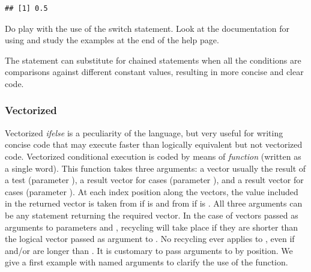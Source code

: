\documentclass[krantz2]{krantz}\usepackage{knitr}
\begin{document}
\begin{knitrout}\footnotesize
{}\color{fgcolor}\begin{kframe}
\begin{alltt}
 \hlkwb{<-} 
 \hlkwb{<-} 
             \hlstd{=} \hlstd{,}
             \hlstd{=}  \hlopt{/} \hlstd{,}
             \hlstd{=}  \hlopt{/} \hlstd{,}
\hlstd{)}
\end{alltt}
\begin{verbatim}
## [1] 0.5
\end{verbatim}
\end{kframe}
\end{knitrout}

\begin{playground}
    Do play with the use of the switch statement. Look at the documentation for  using  and study the examples at the end of the help page.
\end{playground}

The  statement can substitute for chained  statements when all the conditions are comparisons against different constant values, resulting in more concise and clear code.

\subsubsection[Vectorized \texttt{ifelse()}]{Vectorized }
Vectorized \emph{ifelse} is a peculiarity of the \Rlang language, but very useful for writing concise code that may execute faster than logically equivalent but not vectorized code.
Vectorized conditional execution is coded by means of \emph{function}  (written as a single word). This function takes three arguments: a  vector usually the result of a test (parameter ), a result vector for  cases (parameter ), and a result vector for  cases (parameter ). At each index position along the vectors, the value included in the returned vector is taken from  if  is  and from  if  is . All three arguments can be any \Rlang statement returning the required vector. In the case of vectors passed as arguments to parameters  and , recycling will take place if they are shorter than the logical vector passed as argument to . No recycling ever applies to , even if  and/or  are longer than . It is customary to pass arguments to  by position. We give a first example with named arguments to clarify the use of the function.
\end{document}
